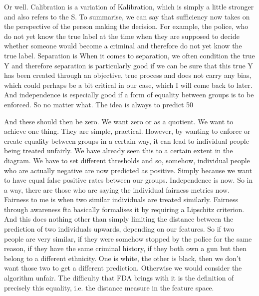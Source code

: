 Or well. Calibration is a variation of Kalibration, which is simply a little stronger and also refers to the S. To summarise, we can say that sufficiency now takes on the perspective of the person making the decision. For example, the police, who do not yet know the true label at the time when they are supposed to decide whether someone would become a criminal and therefore do not yet know the true label. Separation is When it comes to separation, we often condition the true Y and therefore separation is particularly good if we can be sure that this true Y has been created through an objective, true process and does not carry any bias, which could perhaps be a bit critical in our case, which I will come back to later. And independence is especially good if a form of equality between groups is to be enforced. So no matter what. The idea is always to predict 50%

And these should then be zero. We want zero or as a quotient. We want to achieve one thing. They are simple, practical. However, by wanting to enforce or create equality between groups in a certain way, it can lead to individual people being treated unfairly. We have already seen this to a certain extent in the diagram. We have to set different thresholds and so, somehow, individual people who are actually negative are now predicted as positive. Simply because we want to have equal false positive rates between our groups. Independence is now. So in a way, there are those who are saying the individual fairness metrics now. Fairness to me is when two similar individuals are treated similarly. Fairness through awareness fta basically formalises it by requiring a Lipschitz criterion. And this does nothing other than simply limiting the distance between the prediction of two individuals upwards, depending on our features. So if two people are very similar, if they were somehow stopped by the police for the same reason, if they have the same criminal history, if they both own a gun but then belong to a different ethnicity. One is white, the other is black, then we don't want those two to get a different prediction. Otherwise we would consider the algorithm unfair. The difficulty that FDA brings with it is the definition of precisely this equality, i.e. the distance measure in the feature space.

